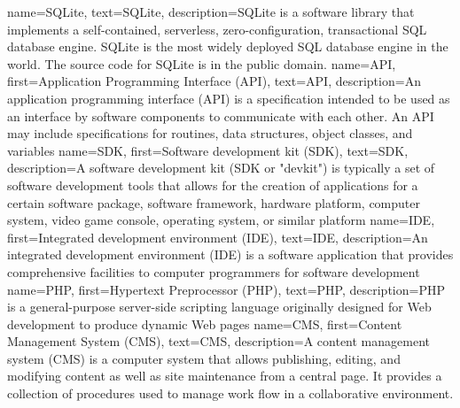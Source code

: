 
{
	name={SQLite},
	text={SQLite},
	description={SQLite is a software library that implements a self-contained, serverless, zero-configuration, transactional SQL database engine. SQLite is the most widely deployed SQL database engine in the world. The source code for SQLite is in the public domain.}
}
{
	name={API},
	first={Application Programming Interface (API)},
	text={API},
	description={An application programming interface (API) is a specification intended to be used 
			as an interface by software components to communicate with each other. 
			An API may include specifications for routines, data structures, object classes, and variables
	}
}
{
	name={SDK},
	first={Software development kit (SDK)},
	text={SDK},
	description={A software development kit (SDK or "devkit") is typically a set of software development 
		tools that allows for the creation of applications for a certain software package, software framework, 
		hardware platform, computer system, video game console, operating system, or similar platform}
}
{
	name={IDE},
	first={Integrated development environment (IDE)},
	text={IDE},
	description={An integrated development environment (IDE) is a software application that provides comprehensive 	facilities to computer programmers for software development}
}
{
	name={PHP},
	first={Hypertext Preprocessor (PHP)},
	text={PHP},
	description={PHP is a general-purpose server-side scripting language originally designed for Web development to produce dynamic Web pages}
}
{
	name={CMS},
	first={Content Management System (CMS)},
	text={CMS},
	description={A content management system (CMS) is a computer system that allows publishing, editing, and modifying content as well as site maintenance from a central page. It provides a collection of procedures used to manage work flow in a collaborative environment.}
}
